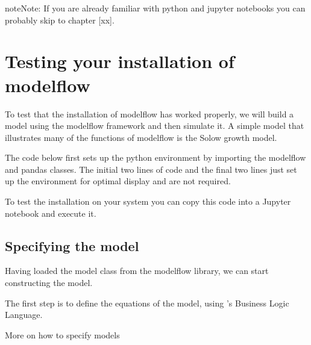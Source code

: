 \documentclass[letterpaper,10pt,english]{jupyterBook}
\begin{document}
\begin{sphinxadmonition}{note}{Note:}
\sphinxAtStartPar
If you are already familiar with python and jupyter notebooks you can probably skip to chapter {[}xx{]}.
\end{sphinxadmonition}

\sphinxstepscope


\chapter{Testing your installation of modelflow}
\label{\detokenize{content/03_Installation/TestingModelFlow:testing-your-installation-of-modelflow}}\label{\detokenize{content/03_Installation/TestingModelFlow::doc}}
\sphinxAtStartPar
To test that the installation of modelflow has worked properly, we will build a model using the modelflow framework and then simulate it.  A simple model that illustrates many of the functions of modelflow is the Solow growth model.

\sphinxAtStartPar
The code below first sets up the python environment by importing the modelflow  and pandas classes.  The initial two lines of code and the final two lines just set up the environment for optimal display and are not required.

\sphinxAtStartPar
To test the installation on your system you can copy this code into a Jupyter notebook and execute it.


\section{Specifying the model}
\label{\detokenize{content/03_Installation/TestingModelFlow:specifying-the-model}}
\sphinxAtStartPar
Having loaded the model class from the modelflow library, we can start constructing the model.

\sphinxAtStartPar
The first step is to define the equations of the model, using ’s Business Logic Language.

\begin{sphinxShadowBox}

\sphinxAtStartPar
More on how to specify models 
\end{sphinxShadowBox}
\end{document}

